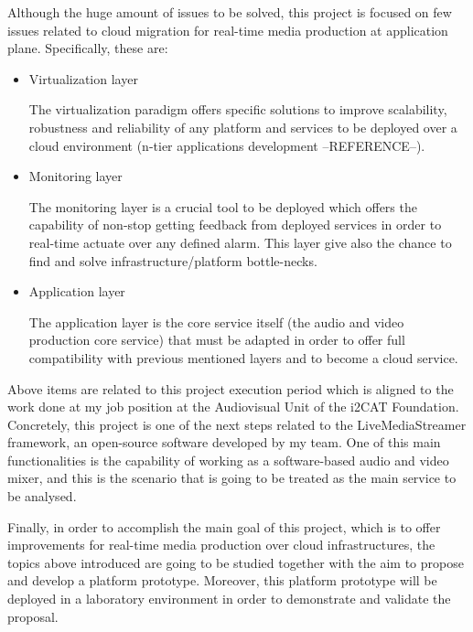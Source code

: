 Although the huge amount of issues to be solved, this project is focused on few issues related to cloud migration for real-time media production at application plane. Specifically, these are:

\begin{itemize}
\item Virtualization layer \hfill 

The virtualization paradigm offers specific solutions to improve scalability, robustness and reliability of any platform and services to be deployed over a cloud environment (n-tier applications development --REFERENCE--). 

\item Monitoring layer \hfill 

The monitoring layer is a crucial tool to be deployed which offers the capability of non-stop getting feedback from deployed services in order to real-time actuate over any defined alarm. This layer give also the chance to find and solve infrastructure/platform bottle-necks.

\item Application layer \hfill 

The application layer is the core service itself (the audio and video production core service) that must be adapted in order to offer full compatibility with previous mentioned layers and to become a cloud service.

\end{itemize}

Above items are related to this project execution period which is aligned to the work done at my job position at the Audiovisual Unit of the i2CAT Foundation. Concretely, this project is one of the next steps related to the LiveMediaStreamer framework, an open-source software developed by my team. One of this main functionalities is the capability of working as a software-based audio and video mixer, and this is the scenario that is going to be treated as the main service to be analysed.

Finally, in order to accomplish the main goal of this project, which is to offer improvements for real-time media production over cloud infrastructures, the topics above introduced are going to be studied together with the aim to propose and develop a platform prototype. Moreover, this platform prototype will be deployed in a laboratory environment in order to demonstrate and validate the proposal.







